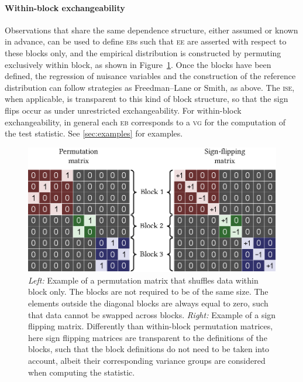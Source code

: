 \paragraph{Within-block exchangeability}

Observations that share the same dependence structure, either assumed or known in advance, can be used to define \textsc{eb}s such that \textsc{ee} are asserted with respect to these blocks only, and the empirical distribution is constructed by permuting exclusively within block, as shown in Figure~\ref{fig:within-block}. Once the blocks have been defined, the regression of nuisance variables and the construction of the reference distribution can follow strategies as Freedman--Lane or Smith, as above. The \textsc{ise}, when applicable, is transparent to this kind of block structure, so that the sign flips occur as under unrestricted exchangeability. For within-block exchangeability, in general each \textsc{eb} corresponds to a \textsc{vg} for the computation of the test statistic. See \ref{sec:examples} for examples.

\begin{figure}[!p]
\centering
\includegraphics{images/within-block.eps}
\caption[Example of permutation and sign flipping matrix for within-block exchangeability]{\emph{Left:} Example of a permutation matrix that shuffles data within block only. The blocks are not required to be of the same size. The elements outside the diagonal blocks are always equal to zero, such that data cannot be swapped across blocks. \emph{Right:} Example of a sign flipping matrix. Differently than within-block permutation matrices, here sign flipping matrices are transparent to the definitions of the blocks, such that the block definitions do not need to be taken into account, albeit their corresponding variance groups are considered when computing the statistic.}
\label{fig:within-block}
\end{figure}

